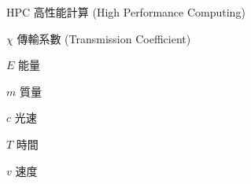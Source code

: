 
\begin{denotation}[3cm]

\item[HPC]{
  高性能計算 (High Performance Computing)
}

\item[$\chi$]{
  傳輸系數 (Transmission Coefficient)
}

\item[$E$]{
  能量
}

\item[$m$]{
  質量
}

\item[$c$]{
  光速
}


\item[$T$]{
  時間
}

\item[$v$]{
  速度
}


\end{denotation}
